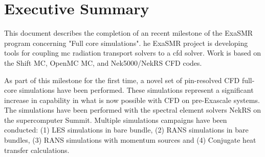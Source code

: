 
\section*{Executive Summary}

This document describes the completion of an recent  milestone of the ExaSMR program concerning  "Full core simulations". he ExaSMR project is developing tools for coupling \acf{mc} radiation
transport solvers to a \acf{cfd} solver.  Work is based on the Shift MC, OpenMC MC, and Nek5000/NekRS CFD codes.

As part of this milestone for the first time, a novel set of pin-resolved CFD full-core simulations have been performed. These simulations represent a significant increase in capability in what is now possible with CFD on pre-Exascale systems. The simulations have been performed with the spectral element solvers NekRS on the supercomputer Summit. Multiple simulations campaigns have been conducted: (1) LES simulations in bare bundle, (2) RANS simulations in bare bundles, (3) RANS simulations with momentum sources and (4) Conjugate heat transfer calculations.
